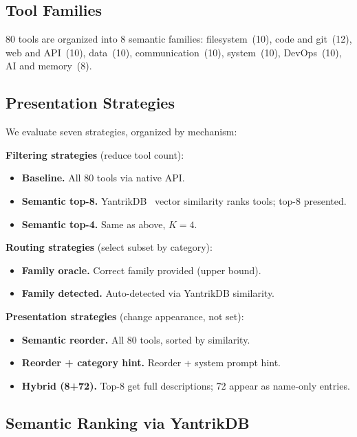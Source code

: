 \documentclass[11pt]{article}
\begin{document}
\subsection{Tool Families}

80 tools are organized into 8 semantic families: filesystem~(10), code and git~(12), web and API~(10), data~(10), communication~(10), system~(10), DevOps~(10), AI and memory~(8).

\subsection{Presentation Strategies}

We evaluate seven strategies, organized by mechanism:

\textbf{Filtering strategies} (reduce tool count):
\begin{itemize}[nosep,leftmargin=*]
  \item \textbf{Baseline.} All 80 tools via native API.
  \item \textbf{Semantic top-8.} YantrikDB~\cite{yantrikdb} vector similarity ranks tools; top-8 presented.
  \item \textbf{Semantic top-4.} Same as above, $K{=}4$.
\end{itemize}

\textbf{Routing strategies} (select subset by category):
\begin{itemize}[nosep,leftmargin=*]
  \item \textbf{Family oracle.} Correct family provided (upper bound).
  \item \textbf{Family detected.} Auto-detected via YantrikDB similarity.
\end{itemize}

\textbf{Presentation strategies} (change appearance, not set):
\begin{itemize}[nosep,leftmargin=*]
  \item \textbf{Semantic reorder.} All 80 tools, sorted by similarity.
  \item \textbf{Reorder + category hint.} Reorder + system prompt hint.
  \item \textbf{Hybrid (8+72).} Top-8 get full descriptions; 72 appear as name-only entries.
\end{itemize}

\subsection{Semantic Ranking via YantrikDB}
\end{document}
